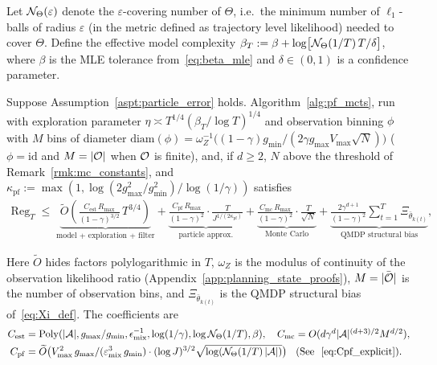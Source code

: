 
Let ${\mathcal{N}}_\Theta(\varepsilon)$ denote the $\varepsilon$-covering number of $\Theta$, i.e.\ the minimum number of $\ell_1$-balls of radius $\varepsilon$ (in the metric defined as trajectory level likelihood) needed to cover $\Theta$. Define the effective model complexity $\beta_T:=\beta+\log\bigl[{\mathcal{N}}_\Theta(1/T)\,T/\delta\bigr]$, where $\beta$ is the MLE tolerance from~\eqref{eq:beta_mle} and $\delta\in(0,1)$ is a confidence parameter.

\begin{thm}\label{thm:final_regret_bound}
Suppose Assumption~\ref{aspt:particle_error} holds. Algorithm~\ref{alg:pf_mcts}, run with exploration parameter $\eta\asymp T^{1/4}(\beta_T/\log T)^{1/4}$ and observation binning $\phi$ with $M$ bins of diameter $\mathrm{diam}(\phi)=\omega_Z^{-1}\bigl((1-\gamma)g_{\min}/(2\gamma g_{\max}V_{\max}\sqrt N)\bigr)$ ($\phi=\mathrm{id}$ and $M=|{\mathcal{O}}|$ when ${\mathcal{O}}$ is finite), and, if $d\ge2$, $N$ above the threshold of Remark~\ref{rmk:mc_constants}, and $\kappa_{\mathrm{pf}}:=\max \left(1, {\log \left(2 g_{\max }^2 / g_{\min }^2\right)}/{\log (1 / \gamma)}\right)$ satisfies
\begin{align}
\mathrm{Reg}_T
\;\le\;
\underbrace{\widetilde O\!\left(\frac{C_{\mathrm{est}}\, R_{\max}}{(1-\gamma)^{3/2}}\,T^{3/4}\right)}_{\text{model + exploration + filter}}
+
\underbrace{\frac{C_{\mathrm{pf}}\,R_{\max}}{(1-\gamma)^2}\cdot\frac{T}{J^{1/(2\kappa_{\mathrm{pf}})}}}_{\text{particle approx.}}
 +
\underbrace{\frac{C_{\mathrm{mc}}\,R_{\max}}{(1-\gamma)^2}\cdot\frac{T}{\sqrt{N}}}_{\text{Monte Carlo}}
+
\underbrace{\frac{2\gamma^{d+1}}{(1-\gamma)^2}\sum_{t=1}^T\Xi_{\bar{\theta}_{k(t)}}}_{\text{QMDP structural bias}}, \nonumber
\end{align}
\end{thm}
Here $\widetilde O$ hides factors polylogarithmic in $T$, $\omega_Z$ is the modulus of continuity of the observation likelihood ratio (Appendix~\ref{app:planning_state_proofs}), $M=|\bar{{\mathcal{O}}}|$ is the number of observation bins, and $\Xi_{\bar{\theta}_{k(t)}}$ is the QMDP structural bias of~\eqref{eq:Xi_def}.
The coefficients are
\begin{align*}
    C_{\mathrm{est}} &= \mathrm{Poly}(|{\mathcal{A}}|, g_{\max}/g_{\min}, \epsilon_\mathrm{mix}^{-1}, \log(1/\gamma), \log{\mathcal{N}}_\Theta(1/T), \beta), \quad C_{\mathrm{mc}} = \textstyle{O(d\gamma^d  |{\mathcal{A}}|^{(d+3)/2}M^{d/2})},\\
    C_{\mathrm{pf}} &=\widetilde{O}\bigl(V_{\max}^2\,g_{\max}/(\varepsilon_{\mathrm{mix}}^3\,g_{\min})\cdot(\log J)^{3/2}\sqrt{\log({\mathcal{N}}_\Theta(1/T)\,|{\mathcal{A}}|)}\bigr) \;\; \text{ (See ~\eqref{eq:Cpf_explicit})}.
\end{align*}


